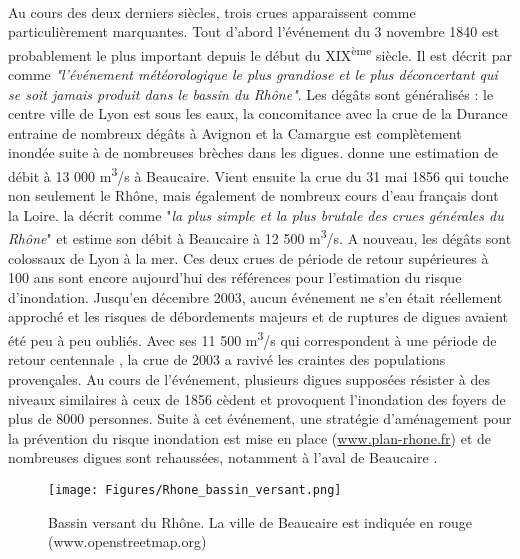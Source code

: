 \documentclass[11pt]{article}
\begin{document}
	\paragraph{} Au cours des deux derniers siècles, trois crues apparaissent comme particulièrement marquantes. Tout d'abord l'événement du 3 novembre 1840 est probablement le plus important depuis le début du XIX\textsuperscript{ème} siècle. Il est décrit par \citet{parde_regime_1925} comme \textit{"l'événement météorologique le plus grandiose et le plus déconcertant qui se soit jamais produit dans le bassin du Rhône"}. Les dégâts sont généralisés : le centre ville de Lyon est sous les eaux, la concomitance avec la crue de la Durance entraine de nombreux dégâts à Avignon et la Camargue est complètement inondée suite à de nombreuses brèches dans les digues. \citet{parde_regime_1925} donne une estimation de débit à 13 000 m\textsuperscript{3}/s à Beaucaire. Vient ensuite la crue du 31 mai 1856 qui touche non seulement le Rhône, mais également de nombreux cours d'eau français dont la Loire. \citet{parde_regime_1925} la décrit comme "\textit{la plus simple et la plus brutale des crues générales du Rhône}" et estime son débit à Beaucaire à 12 500 m\textsuperscript{3}/s. A nouveau, les dégâts sont colossaux de Lyon à la mer. Ces deux crues de période de retour supérieures à 100 ans sont encore aujourd'hui des références pour l'estimation du risque d'inondation. Jusqu'en décembre 2003, aucun événement ne s'en était réellement approché et les risques de débordements majeurs et de ruptures de digues avaient été peu à peu oubliés. Avec ses 11 500 m\textsuperscript{3}/s qui correspondent à une période de retour centennale \citep{medd_debit_2005}, la crue de 2003 a ravivé les craintes des populations provençales. Au cours de l'événement, plusieurs digues supposées résister à des niveaux similaires à ceux de 1856 cèdent et provoquent l'inondation des foyers de plus de 8000 personnes. Suite à cet événement, une stratégie d'aménagement pour la prévention du risque inondation est mise en place (\url{www.plan-rhone.fr}) et de nombreuses digues sont rehaussées, notamment à l'aval de Beaucaire \citep{symadrem_programme_2012}. 
	
	\begin{figure}[h!]
	\centering
		\texttt{[image: Figures/Rhone\_bassin\_versant.png]}
        \caption{Bassin versant du Rhône. La ville de Beaucaire est indiquée en rouge (www.openstreetmap.org)}	
		\label{fig:BV}
	\end{figure}
	
\end{document}
